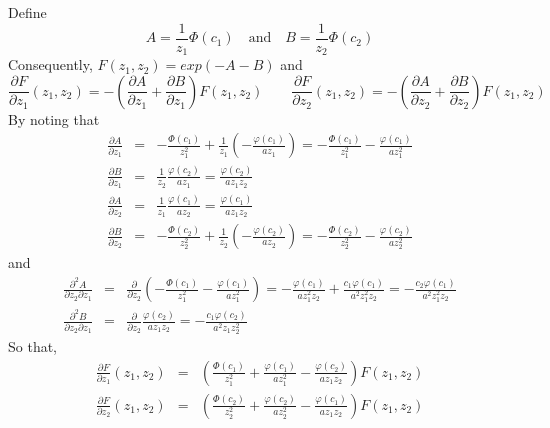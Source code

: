 \documentclass{article}
\begin{document}
Define
\begin{equation}
  \label{eq:3}
  A = \frac{1}{z_1}\Phi(c_1) \quad \text{and} \quad B = \frac{1}{z_2}\Phi(c_2)
\end{equation}
Consequently, $F(z_1, z_2) = exp(-A -B)$ and
\begin{equation}
  \label{eq:4}
  \frac{\partial F}{\partial z_1} (z_1, z_2) = - \left(\frac{\partial
      A}{\partial z_1} + \frac{\partial B}{\partial z_1} \right)
  F(z_1, z_2)\qquad
  \frac{\partial F}{\partial z_2} (z_1, z_2) = - \left(\frac{\partial
      A}{\partial z_2} + \frac{\partial B}{\partial z_2} \right)
  F(z_1, z_2)
\end{equation}
By noting that
\begin{eqnarray}
  \label{eq:5}
  \frac{\partial A}{\partial z_1} &=& -\frac{\Phi(c_1)}{z_1^2} +
  \frac{1}{z_1} \left(-\frac{\varphi(c_1)}{az_1}\right) =
  -\frac{\Phi(c_1)}{z_1^2} - \frac{\varphi(c_1)}{az_1^2}\\
  \frac{\partial B}{\partial z_1} &=& \frac{1}{z_2}
  \frac{\varphi(c_2)}{az_1} = \frac{\varphi(c_2)}{az_1z_2}\\
  \frac{\partial A}{\partial z_2} &=& \frac{1}{z_1}
  \frac{\varphi(c_1)}{az_2} = \frac{\varphi(c_1)}{az_1z_2}\\
  \frac{\partial B}{\partial z_2} &=& -\frac{\Phi(c_2)}{z_2^2} +
  \frac{1}{z_2} \left(- \frac{\varphi(c_2)}{az_2}\right) =
  -\frac{\Phi(c_2)}{z_2^2} - \frac{\varphi(c_2)}{az_2^2}
\end{eqnarray}
and
\begin{eqnarray}
  \label{eq:10}
   \frac{\partial^2 A}{\partial z_2 \partial z_1} &=& 
   \frac{\partial }{\partial z_2} \left(-\frac{\Phi(c_1)}{z_1^2} -
     \frac{\varphi(c_1)}{az_1^2}\right) = -\frac{\varphi(c_1)}{a z_1^2
     z_2} + \frac{c_1\varphi(c_1)}{a^2 z_1^2 z_2} = -\frac{c_2
     \varphi(c_1)}{a^2z_1^2z_2}\\
   \frac{\partial^2 B}{\partial z_2 \partial z_1} &=& \frac{\partial
   }{\partial z_2} \frac{\varphi(c_2)}{az_1z_2} =
   -\frac{c_1\varphi(c_2)}{a^2z_1z_2^2}
\end{eqnarray}
So that,
\begin{eqnarray}
  \label{eq:7}
  \frac{\partial F}{\partial z_1} (z_1, z_2) &=&  \left(
    \frac{\Phi(c_1)}{z_1^2} + \frac{\varphi(c_1)}{az_1^2} -
    \frac{\varphi(c_2)}{az_1z_2} \right) F(z_1, z_2)\\
  \frac{\partial F}{\partial z_2} (z_1, z_2) &=& \left(
   \frac{\Phi(c_2)}{z_2^2} + \frac{\varphi(c_2)}{az_2^2}
   -\frac{\varphi(c_1)}{az_1z_2} \right) F(z_1, z_2)
\end{eqnarray}
\end{document}
